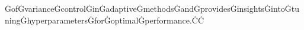 ĠofĠvarianceĠcontrolĠinĠadaptiveĠmethodsĠandĠprovidesĠinsightsĠintoĠtuningĠhyperparametersĠforĠoptimalĠperformance.ĊĊ%